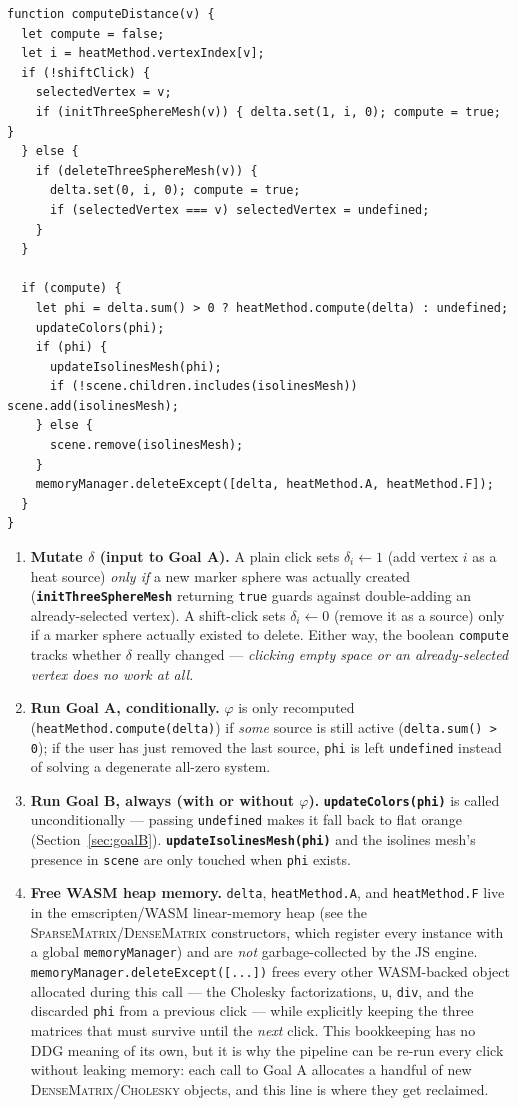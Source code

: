 \documentclass[11pt]{article}
\newcommand{\code}[1]{\texttt{#1}}
\newcommand{\func}[1]{\texttt{\textbf{#1}}}
\newcommand{\type}[1]{\textsc{#1}}
\begin{document}
\begin{lstlisting}
function computeDistance(v) {
  let compute = false;
  let i = heatMethod.vertexIndex[v];
  if (!shiftClick) {
    selectedVertex = v;
    if (initThreeSphereMesh(v)) { delta.set(1, i, 0); compute = true; }
  } else {
    if (deleteThreeSphereMesh(v)) {
      delta.set(0, i, 0); compute = true;
      if (selectedVertex === v) selectedVertex = undefined;
    }
  }

  if (compute) {
    let phi = delta.sum() > 0 ? heatMethod.compute(delta) : undefined;
    updateColors(phi);
    if (phi) {
      updateIsolinesMesh(phi);
      if (!scene.children.includes(isolinesMesh)) scene.add(isolinesMesh);
    } else {
      scene.remove(isolinesMesh);
    }
    memoryManager.deleteExcept([delta, heatMethod.A, heatMethod.F]);
  }
}
\end{lstlisting}

\begin{enumerate}[leftmargin=1.6em]
\item \textbf{Mutate $\delta$ (input to Goal A).} A plain click sets $\delta_i \leftarrow 1$
  (add vertex $i$ as a heat source) \emph{only if} a new marker sphere was actually created
  (\func{initThreeSphereMesh} returning \code{true} guards against double-adding an
  already-selected vertex). A shift-click sets $\delta_i \leftarrow 0$ (remove it as a
  source) only if a marker sphere actually existed to delete. Either way, the boolean
  \code{compute} tracks whether $\delta$ really changed --- \emph{clicking empty space or an
  already-selected vertex does no work at all.}
\item \textbf{Run Goal A, conditionally.} $\varphi$ is only recomputed
  (\code{heatMethod.compute(delta)}) if \emph{some} source is still active
  (\code{delta.sum() > 0}); if the user has just removed the last source, \code{phi} is left
  \code{undefined} instead of solving a degenerate all-zero system.
\item \textbf{Run Goal B, always (with or without $\varphi$).}
  \func{updateColors(phi)} is called unconditionally --- passing \code{undefined} makes it
  fall back to flat orange (Section~\ref{sec:goalB}). \func{updateIsolinesMesh(phi)} and the
  isolines mesh's presence in \code{scene} are only touched when \code{phi} exists.
\item \textbf{Free WASM heap memory.} \code{delta}, \code{heatMethod.A}, and
  \code{heatMethod.F} live in the emscripten/WASM linear-memory heap (see the
  \type{SparseMatrix}/\type{DenseMatrix} constructors, which register every instance with a
  global \code{memoryManager}) and are \emph{not} garbage-collected by the JS engine.
  \code{memoryManager.deleteExcept([...])} frees every other WASM-backed object allocated
  during this call --- the Cholesky factorizations, \code{u}, \code{div}, and the discarded
  \code{phi} from a previous click --- while explicitly keeping the three matrices that must
  survive until the \emph{next} click. This bookkeeping has no DDG meaning of its own, but
  it is why the pipeline can be re-run every click without leaking memory: each call to
  Goal A allocates a handful of new \type{DenseMatrix}/\type{Cholesky} objects, and this line
  is where they get reclaimed.
\end{enumerate}
\end{document}

